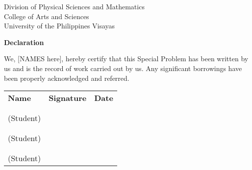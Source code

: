 \begin{center}
	Division of Physical Sciences and Mathematics\\
	College of Arts and Sciences\\
	University of the Philippines Visayas 
	
		\textbf{Declaration}
		\end{center}

We,  [NAMES here], hereby certify that this Special Problem has been written by us  and is the record of work carried out by us. Any significant borrowings have been properly acknowledged and referred.

	\begin{tabular}{lll}
	\bfseries Name  & \bfseries Signature & \bfseries Date\\ \\
	\signaturerule &\signaturerule  & \signaturerule\\ 
	(Student)\\ \\
	\signaturerule &\signaturerule &\signaturerule\\
	(Student)\\ \\
	\signaturerule &\signaturerule &\signaturerule\\
	(Student)
\end{tabular}